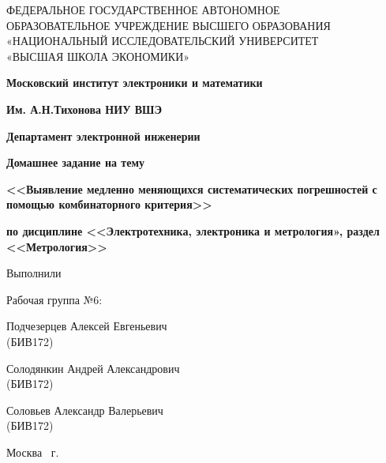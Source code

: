 \begin{titlepage}
	\begin{center}
		ФЕДЕРАЛЬНОЕ  ГОСУДАРСТВЕННОЕ АВТОНОМНОЕ \\
		ОБРАЗОВАТЕЛЬНОЕ УЧРЕЖДЕНИЕ ВЫСШЕГО ОБРАЗОВАНИЯ\\
		«НАЦИОНАЛЬНЫЙ ИССЛЕДОВАТЕЛЬСКИЙ УНИВЕРСИТЕТ\\
		«ВЫСШАЯ ШКОЛА ЭКОНОМИКИ»
	\end{center}
	
	\begin{center}
		\textbf{Московский институт электроники и математики}
		
		\textbf{Им. А.Н.Тихонова НИУ ВШЭ}
		
		\textbf{Департамент электронной инженерии}
	\end{center}
	\vspace{1ex}	
	\begin{center}
		\textbf{Домашнее задание на тему}
	\end{center}	
	\vspace{1ex}
	\begin{center}
		\textbf{{\Large <<Выявление медленно меняющихся систематических погрешностей с помощью комбинаторного критерия>>}}
	\end{center}	
	\vspace{2ex}
	\begin{center}
\textbf{	
		по дисциплине 
		<<Электротехника, электроника и метрология», раздел <<Метрология>>}


	\end{center}
	\vspace{2ex}
	\begin{flushright}
		Выполнили
		
		Рабочая группа №6:
		
		Подчезерцев Алексей Евгеньевич \\ (БИВ172)
		
		Солодянкин Андрей Александрович \\ (БИВ172)
		
		Соловьев Александр Валерьевич \\ (БИВ172)
	\end{flushright}
	\vspace{3ex}
	\vfill
	\begin{center}
		Москва \the\year \, г.
	\end{center}
\end{titlepage}